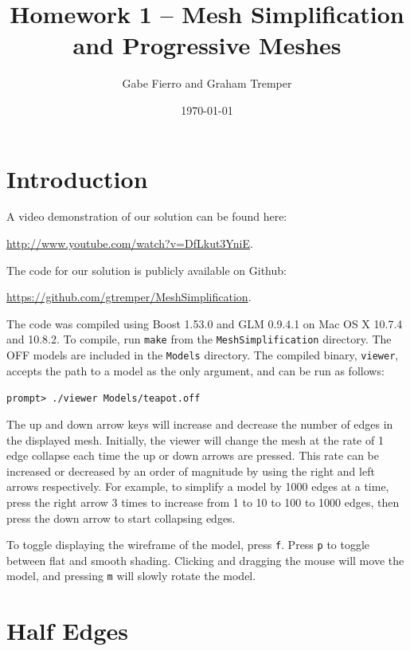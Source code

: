 \documentclass[11pt]{article}
\begin{document}
\title{Homework 1 -- Mesh Simplification and Progressive Meshes}
\author{Gabe Fierro and Graham Tremper}
\date{\today}
\maketitle

\section{Introduction}

A video demonstration of our solution can be found here:
\begin{center}
\href{http://www.youtube.com/watch?v=DfLkut3YniE}{http://www.youtube.com/watch?v=DfLkut3YniE}.
\end{center}
The code for our solution is publicly available on Github:
\begin{center}
\href{https://github.com/gtremper/MeshSimplification}{https://github.com/gtremper/MeshSimplification}.
\end{center}
The code was compiled using Boost 1.53.0 and GLM 0.9.4.1 on Mac OS X 10.7.4 and
10.8.2. To compile, run \verb`make` from the \verb`MeshSimplification` directory. The OFF models
are included in the \verb`Models` directory. The compiled binary, \verb`viewer`,
accepts the path to a model as the only argument, and can be run as follows:

\begin{center}
  \verb`prompt> ./viewer Models/teapot.off`
\end{center}

The up and down arrow keys will increase and decrease the number of edges in
the displayed mesh. Initially, the viewer will change the mesh at the rate of 1
edge collapse each time the up or down arrows are pressed. This rate can be
increased or decreased by an order of magnitude by using the right and left
arrows respectively. For example, to simplify a model by 1000 edges at a time,
press the right arrow 3 times to increase from 1 to 10 to 100 to 1000 edges,
then press the down arrow to start collapsing edges.

To toggle displaying the wireframe of the model, press \verb`f`. Press \verb`p`
to toggle between flat and smooth shading. Clicking and dragging the mouse will
move the model, and pressing \verb`m` will slowly rotate the model.

\section{Half Edges}
\end{document}
